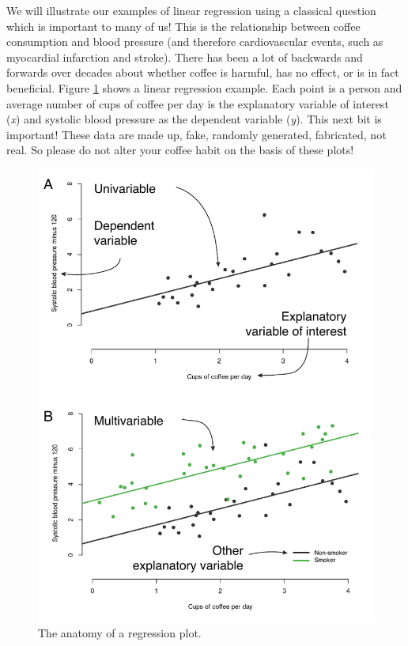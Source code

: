 \documentclass[12pt,]{krantz}
\theoremstyle{definition}
\theoremstyle{definition}
\theoremstyle{definition}
\theoremstyle{remark}
\begin{document}
We will illustrate our examples of linear regression using a classical
question which is important to many of us! This is the relationship
between coffee consumption and blood pressure (and therefore
cardiovascular events, such as myocardial infarction and stroke). There
has been a lot of backwards and forwards over decades about whether
coffee is harmful, has no effect, or is in fact beneficial. Figure
\ref{fig:chap07-fig-regression} shows a linear regression example. Each
point is a person and average number of cups of coffee per day is the
explanatory variable of interest (\emph{x}) and systolic blood pressure
as the dependent variable (\emph{y}). This next bit is important! These
data are made up, fake, randomly generated, fabricated, not real. So
please do not alter your coffee habit on the basis of these plots!

\begin{figure}
\centering
\includegraphics{images/chapter07/1_regression_terms.pdf}
\caption{\label{fig:chap07-fig-regression}The anatomy of a regression plot.}
\end{figure}
\end{document}
